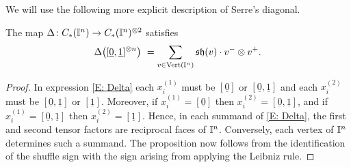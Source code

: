 We will use the following more explicit description of Serre's diagonal.

\begin{proposition} \label{P: diagonal in terms of vertices}
	The map $\Delta \colon C_{\ast}(\mathbb{I}^n) \to C_{\ast}(\mathbb{I}^n)^{\otimes 2}$ satisfies
	\begin{equation*}
	\Delta \big([\underline 0, \underline 1]^{\otimes n}\big) \ =
	\sum_{v \in {\rm Vert}(\mathbb{I}^n)} \mathfrak{sh}(v) \cdot v^- \otimes v^+.
	\end{equation*}
\end{proposition}

\begin{proof}
	In expression \eqref{E: Delta} each $x_i^{(1)}$ must be $[\underline 0]$ or $[\underline 0, \underline 1]$ and each $x_i^{(2)}$ must be $[\underline 0, \underline 1]$ or $[\underline 1]$.
	Moreover, if $x_i^{(1)} = [\underline 0]$ then $x_i^{(2)} = [\underline 0, \underline 1]$, and if $x_i^{(1)} = [\underline 0, \underline 1]$ then $x_i^{(2)} = [\underline 1]$.
	Hence, in each summand of \eqref{E: Delta}, the first and second tensor factors are reciprocal faces of $\mathbb{I}^n$. Conversely, each vertex of $\mathbb{I}^n$ determines such a summand.
	The proposition now follows from the identification of the shuffle sign with the sign arising from applying the Leibniz rule.
\end{proof}

